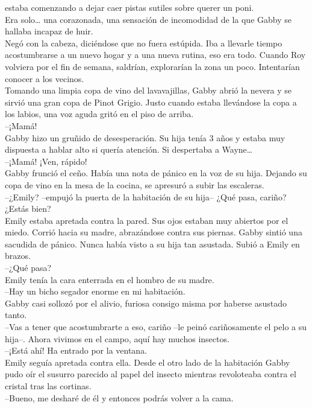estaba comenzando a dejar caer pistas sutiles sobre querer un poni.\\
Era solo\ldots{} una corazonada, una sensación de incomodidad de la que
Gabby se hallaba incapaz de huir.\\
Negó con la cabeza, diciéndose que no fuera estúpida. Iba a llevarle
tiempo acostumbrarse a un nuevo hogar y a una nueva rutina, eso era
todo. Cuando Roy volviera por el fin de semana, saldrían, explorarían la
zona un poco. Intentarían conocer a los vecinos.\\
Tomando una limpia copa de vino del lavavajillas, Gabby abrió la nevera
y se sirvió una gran copa de Pinot Grigio. Justo cuando estaba
llevándose la copa a los labios, una voz aguda gritó en el piso de
arriba.\\
--¡Mamá!\\
Gabby hizo un gruñido de desesperación. Su hija tenía 3 años y estaba
muy dispuesta a hablar alto si quería atención. Si despertaba a
Wayne\ldots{}\\
--¡Mamá! ¡Ven, rápido!\\
Gabby frunció el ceño. Había una nota de pánico en la voz de su hija.
Dejando su copa de vino en la mesa de la cocina, se apresuró a subir las
escaleras.\\
--¿Emily? --empujó la puerta de la habitación de su hija-- ¿Qué pasa,
cariño? ¿Estás bien?\\
Emily estaba apretada contra la pared. Sus ojos estaban muy abiertos por
el miedo. Corrió hacia su madre, abrazándose contra sus piernas. Gabby
sintió una sacudida de pánico. Nunca había visto a su hija tan asustada.
Subió a Emily en brazos.\\
--¿Qué pasa?\\
Emily tenía la cara enterrada en el hombro de su madre.\\
--Hay un bicho segador enorme en mi habitación.\\
Gabby casi sollozó por el alivio, furiosa consigo misma por haberse
asustado tanto.\\
--Vas a tener que acostumbrarte a eso, cariño --le peinó cariñosamente
el pelo a su hija--. Ahora vivimos en el campo, aquí hay muchos
insectos.\\
--¡Está ahí! Ha entrado por la ventana.\\
Emily seguía apretada contra ella. Desde el otro lado de la habitación
Gabby pudo oír el susurro parecido al papel del insecto mientras
revoloteaba contra el cristal tras las cortinas.\\
--Bueno, me desharé de él y entonces podrás volver a la cama.\\
